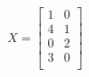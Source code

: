 \documentclass[10pt]{article}
\begin{document}
\begin{align*}X = \begin{bmatrix}1 & 0 \\4 & 1 \\0 & 2 \\3 & 0 \\\end{bmatrix} \end{align*}
\end{document}
